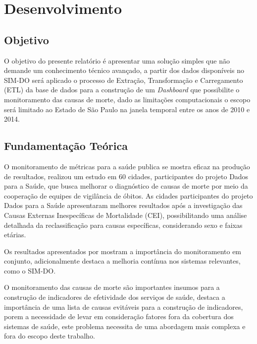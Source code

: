 

\chapter{Desenvolvimento}\label{cap_exemplos}

\section{Objetivo}

O objetivo do presente relatório é apresentar uma solução simples que não demande um conhecimento técnico avançado, a partir dos dados disponíveis no SIM-DO será aplicado o processo de Extração, Transformação e Carregamento (ETL) da base de dados para a construção de um \textit{Dashboard} que possibilite o monitoramento das causas de morte, dado as limitações computacionais o escopo será limitado ao Estado de São Paulo na janela temporal entre os anos de 2010 e 2014.

\section{Fundamentação Teórica}

O monitoramento de métricas para a saúde publica se mostra eficaz na produção de resultados,  realizou um estudo em 60 cidades, participantes do projeto Dados para a Saúde, que busca melhorar o diagnóstico de causas de morte por meio da cooperação de equipes de vigilância de óbitos. As cidades participantes do projeto Dados para a Saúde apresentaram melhores resultados após a investigação das Causas Externas Inespecíficas de Mortalidade (CEI), possibilitando uma análise detalhada da reclassificação para causas específicas, considerando sexo e faixas etárias.

Os resultados apresentados por  mostram a importância do monitoramento em conjunto, adicionalmente destaca a melhoria contínua nos sistemas relevantes, como o SIM-DO.

O monitoramento das causas de morte são importantes insumos para a construção de indicadores de efetividade dos serviços de saúde,  destaca a importância de uma lista de causas evitáveis para a construção de indicadores, porem a necessidade de levar em consideração fatores fora da cobertura dos sistemas de saúde, este problema necessita de uma abordagem mais complexa e fora do escopo deste trabalho.

